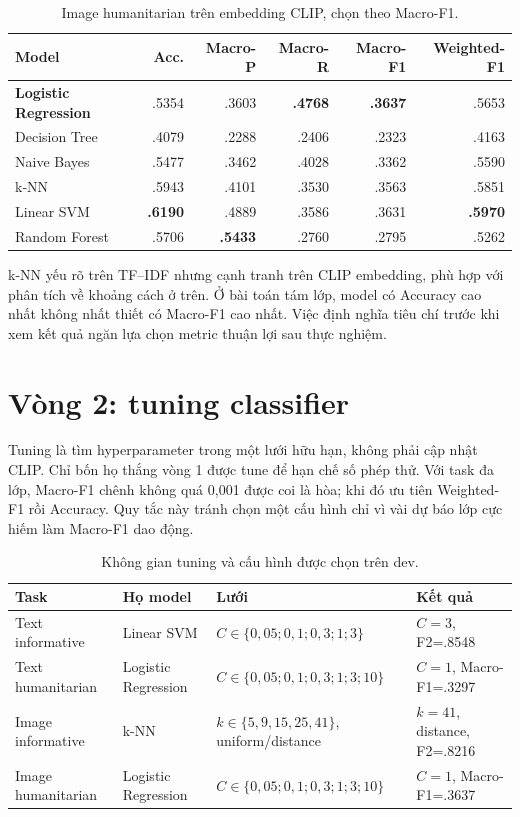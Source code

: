 \begin{table}[H]\centering\scriptsize
\caption{Image humanitarian trên embedding CLIP, chọn theo Macro-F1.}
\begin{tabular}{lrrrrr}
\toprule
\textbf{Model} & \textbf{Acc.} & \textbf{Macro-P} & \textbf{Macro-R} &
\textbf{Macro-F1} & \textbf{Weighted-F1}\\
\midrule
\textbf{Logistic Regression} & .5354 & .3603 & \textbf{.4768} & \textbf{.3637} & .5653\\
Decision Tree & .4079 & .2288 & .2406 & .2323 & .4163\\
Naive Bayes & .5477 & .3462 & .4028 & .3362 & .5590\\
k-NN & .5943 & .4101 & .3530 & .3563 & .5851\\
Linear SVM & \textbf{.6190} & .4889 & .3586 & .3631 & \textbf{.5970}\\
Random Forest & .5706 & \textbf{.5433} & .2760 & .2795 & .5262\\
\bottomrule
\end{tabular}
\end{table}

k-NN yếu rõ trên TF--IDF nhưng cạnh tranh trên CLIP embedding, phù hợp với phân
tích về khoảng cách ở trên. Ở bài toán tám lớp, model có Accuracy cao nhất
không nhất thiết có Macro-F1 cao nhất. Việc định nghĩa tiêu chí trước khi xem
kết quả ngăn lựa chọn metric thuận lợi sau thực nghiệm.

\section{Vòng 2: tuning classifier}

Tuning là tìm hyperparameter trong một lưới hữu hạn, không phải cập nhật CLIP.
Chỉ bốn họ thắng vòng 1 được tune để hạn chế số phép thử. Với task đa lớp,
Macro-F1 chênh không quá 0,001 được coi là hòa; khi đó ưu tiên Weighted-F1 rồi
Accuracy. Quy tắc này tránh chọn một cấu hình chỉ vì vài dự báo lớp cực hiếm làm
Macro-F1 dao động.

\begin{table}[H]\centering\small
\caption{Không gian tuning và cấu hình được chọn trên dev.}
\begin{tabularx}{\textwidth}{p{2.8cm}p{2.6cm}Xp{2.2cm}}
\toprule
\textbf{Task} & \textbf{Họ model} & \textbf{Lưới} & \textbf{Kết quả}\\
\midrule
Text informative & Linear SVM &
\(C\in\{0{,}05;0{,}1;0{,}3;1;3\}\) &
\(C=3\), F2=.8548\\
Text humanitarian & Logistic Regression &
\(C\in\{0{,}05;0{,}1;0{,}3;1;3;10\}\) &
\(C=1\), Macro-F1=.3297\\
Image informative & k-NN &
\(k\in\{5,9,15,25,41\}\), uniform/distance &
\(k=41\), distance, F2=.8216\\
Image humanitarian & Logistic Regression &
\(C\in\{0{,}05;0{,}1;0{,}3;1;3;10\}\) &
\(C=1\), Macro-F1=.3637\\
\bottomrule
\end{tabularx}
\end{table}

